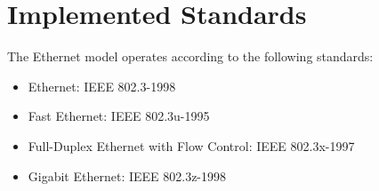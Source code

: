 \section{Implemented Standards}
\label{sec:ethernet:implemented-standards}

The Ethernet model operates according to the following standards:

\begin{itemize}
  \item Ethernet: IEEE 802.3-1998
  \item Fast Ethernet: IEEE 802.3u-1995
  \item Full-Duplex Ethernet with Flow Control: IEEE 802.3x-1997
  \item Gigabit Ethernet: IEEE 802.3z-1998
\end{itemize}


